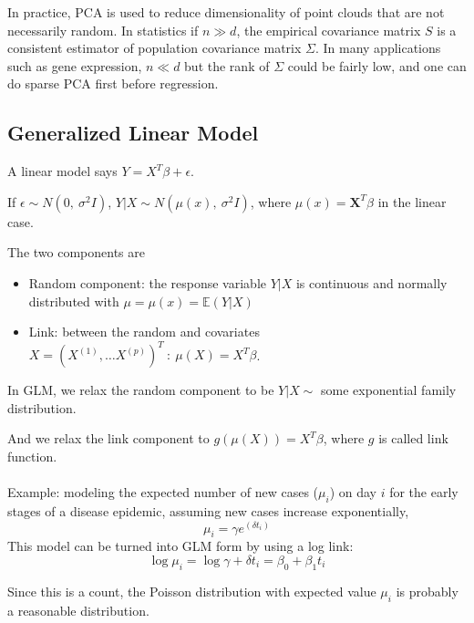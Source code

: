 \documentclass{article}
\begin{document}
In practice, PCA is used to reduce dimensionality of point clouds that are not necessarily random.
In statistics if $n \gg d$, the empirical covariance matrix $S$ is a consistent estimator of population covariance matrix $\Sigma$.
In many applications such as gene expression, $n \ll d$ but the rank of $\Sigma$ could be fairly low, and one can do sparse PCA first before regression.

\subsection{Generalized Linear Model}

A linear model says $Y = X^T \beta + \epsilon$.

If $\epsilon \sim \mathit{N}(0, ~ \sigma^2 I)$,
$Y | X \sim \mathit{N}(\mu(x), ~ \sigma^2 I)$,
where $\mu(x) = \mathbf{X}^T \beta$ in the linear case.

The two components are
\begin{itemize}
  \item Random component: the response variable $Y | X$ is continuous and normally distributed with $\mu = \mu(x) = \mathbb{E}(Y | X)$
  \item Link: between the random and covariates $X = (X^{(1)}, \dots X^{(p)})^T ~ : ~ \mu(X) = X^T \beta$.
\end{itemize}

In GLM,
we relax the random component to be $Y | X \sim $ some exponential family distribution.

And we relax the link component to $g(\mu(X)) = X^T \beta$, where $g$ is called link function.
\\
\\
Example:
modeling the expected number of new cases ($\mu_i$) on day $i$ for the early stages of a disease epidemic,
assuming new cases increase exponentially,
$$
\mu_i = \gamma e^{(\delta t_i)}
$$
This model can be turned into GLM form by using a log link:
$$
\log{\mu_i} = \log{\gamma} + \delta t_i = \beta_0 + \beta_1 t_i
$$

Since this is a count, the Poisson distribution with expected value $\mu_i$ is probably a reasonable distribution.
\\
\\
\end{document}
